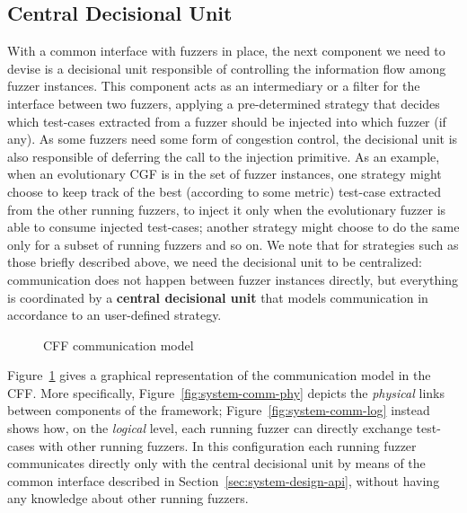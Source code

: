 \subsection{Central Decisional Unit}
\label{sec:system-design-cdu}
With a common interface with fuzzers in place, the next component we need to
devise is a decisional unit responsible of controlling the information flow
among fuzzer instances. This component acts as an intermediary or a filter for
the interface between two fuzzers, applying a pre-determined strategy that
decides which test-cases extracted from a fuzzer should be injected into which
fuzzer (if any). As some fuzzers need some form of congestion control, the
decisional unit is also responsible of deferring the call to the injection
primitive. As an example, when an evolutionary \ac{CGF} is in the set of fuzzer
instances, one strategy might choose to keep track of the best (according to
some metric) test-case extracted from the other running fuzzers, to inject it
only when the evolutionary fuzzer is able to consume injected test-cases;
another strategy might choose to do the same only for a subset of running
fuzzers and so on. We note that for strategies such as those briefly described
above, we need the decisional unit to be centralized: communication does not
happen between fuzzer instances directly, but everything is coordinated by a
\textbf{central decisional unit} that models communication in accordance to an
user-defined strategy.

\begin{figure}
    \centering
    \qquad
\caption{\acl{CFF} communication model}
\label{fig:system-comm}
\end{figure}

Figure~\ref{fig:system-comm} gives a graphical representation of the
communication model in the \ac{CFF}. More specifically,
Figure~\ref{fig:system-comm-phy} depicts the \emph{physical} links between
components of the framework; Figure~\ref{fig:system-comm-log} instead shows how,
on the \emph{logical} level, each running fuzzer can directly exchange
test-cases with other running fuzzers. In this configuration each running fuzzer
communicates directly only with the central decisional unit by means of the
common interface described in Section~\ref{sec:system-design-api}, without
having any knowledge about other running fuzzers.

